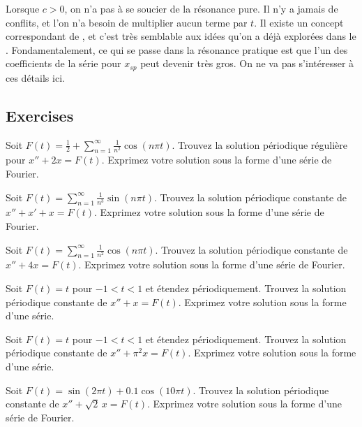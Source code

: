 Lorsque $c > 0$, on n'a pas à se soucier de la résonance pure. Il n'y a jamais de conflits, et l'on n'a besoin de multiplier aucun terme par $t$. Il existe un concept correspondant de , et c'est très semblable aux idées qu'on a déjà explorées dans le .
Fondamentalement, ce qui se passe dans la résonance pratique est que l'un des coefficients de la série pour $ x_ {sp} $ peut devenir très gros. On ne va pas s'intéresser à ces détails ici.  

\subsection{Exercises}

\begin{exercise}
Soit $F(t) = \frac{1}{2} + \sum_{n=1}^\infty \frac{1}{n^2} \cos (n \pi t)$.
Trouvez la solution périodique régulière pour
$x'' + 2 x = F(t)$.  Exprimez votre solution sous la forme d'une série de Fourier. 
\end{exercise}

\begin{exercise}
Soit $F(t) = \sum_{n=1}^\infty \frac{1}{n^3} \sin (n \pi t)$.  Trouvez
la solution périodique constante de 
$x'' + x' + x = F(t)$. Exprimez votre solution sous la forme d'une série de Fourier. 
\end{exercise}

\begin{exercise}
Soit $F(t) = \sum_{n=1}^\infty \frac{1}{n^2} \cos (n \pi t)$. Trouvez
la solution périodique constante de 
$x'' + 4 x = F(t)$.  Exprimez votre solution sous la forme d'une série de Fourier. 
\end{exercise}

\begin{exercise}
Soit $F(t) = t$ pour $-1 < t < 1$ et étendez périodiquement.
Trouvez la solution périodique constante de 
$x'' + x = F(t)$.  Exprimez votre solution sous la forme d'une série.
\end{exercise}

\begin{exercise}
Soit $F(t) = t$ pour $-1 < t < 1$ et étendez périodiquement.
Trouvez la solution périodique constante de 
$x'' + \pi^2 x = F(t)$. Exprimez votre solution sous la forme d'une série.
\end{exercise}

\setcounter{exercise}{100}

\begin{exercise}
Soit $F(t) = \sin(2\pi t) + 0.1 \cos(10 \pi t)$.
Trouvez la solution périodique constante de $x'' + \sqrt{2}\, x = F(t)$.
Exprimez votre solution sous la forme d'une série de Fourier.
\end{exercise}


